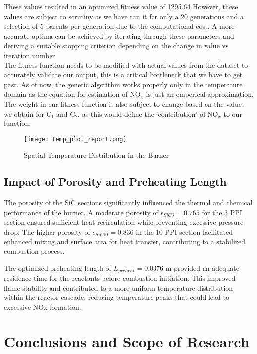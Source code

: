 \documentclass[12pt]{report}
\begin{document}
These values resulted in an optimized fitness value of 1295.64
However, these values are subject to scrutiny as we have ran it for only a 20 generations and a selection of 5 parents per generation due to the computational cost. A more accurate optima can be achieved by iterating through these parameters and deriving a suitable stopping criterion depending on the change in value vs iteration number
\\
The fitness function needs to be modified with actual values from the dataset to accurately validate our output, this is a critical bottleneck that we have to get past. As of now, the genetic algorithm works properly only in the temperature domain as the equation for estimation of NO$_{x}$ is just an emperical approximation.
The weight in our fitness function is also subject to change based on the values we obtain for C$_1$ and C$_2$, as this would define the 'contribution' of NO$_x$ to our function.

\begin{figure}[H]
    \centering
    \texttt{[image: Temp\_plot\_report.png]}
    \caption{Spatial Temperature Distribution in the Burner}
    
\end{figure}


\section{Impact of Porosity and Preheating Length}

The porosity of the SiC sections significantly influenced the thermal and chemical performance of the burner. A moderate porosity of $\epsilon_{SiC3} = 0.765$ for the 3 PPI section ensured sufficient heat recirculation while preventing excessive pressure drop. The higher porosity of $\epsilon_{SiC10} = 0.836$ in the 10 PPI section facilitated enhanced mixing and surface area for heat transfer, contributing to a stabilized combustion process.

The optimized preheating length of $L_{preheat} = 0.0376$ m provided an adequate residence time for the reactants before combustion initiation. This improved flame stability and contributed to a more uniform temperature distribution within the reactor cascade, reducing temperature peaks that could lead to excessive NOx formation.



\chapter{Conclusions and Scope of Research}
\end{document}
